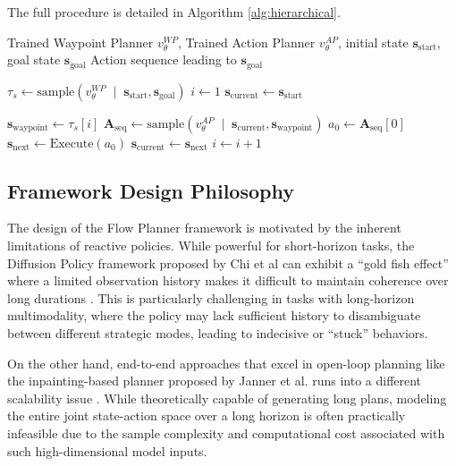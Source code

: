 The full procedure is detailed in Algorithm \ref{alg:hierarchical}.
\begin{algorithm}
\caption{Hierarchical Planning}\label{alg:hierarchical}
\begin{algorithmic}[1]
\Require Trained Waypoint Planner $v_{\theta}^{WP}$, Trained Action Planner $v_{\theta}^{AP}$, initial state $\mathbf{s}_{\text{start}}$, goal state $\mathbf{s}_{\text{goal}}$
\Ensure Action sequence leading to $\mathbf{s}_{\text{goal}}$

\State $\tau_s \gets \text{sample}\!\left(v_{\theta}^{WP} \;\mid\; \mathbf{s}_{\text{start}}, \mathbf{s}_{\text{goal}}\right)$ 
\State $i \gets 1$
\State $\mathbf{s}_{\text{current}} \gets \mathbf{s}_{\text{start}}$

    \State $\mathbf{s}_{\text{waypoint}} \gets \tau_s[i]$
    \State $\mathbf{A}_{\text{seq}} \gets \text{sample}\!\left(v_{\theta}^{AP} \;\mid\; \mathbf{s}_{\text{current}}, \mathbf{s}_{\text{waypoint}}\right)$
    \State $a_0 \gets \mathbf{A}_{\text{seq}}[0]$
    \State $\mathbf{s}_{\text{next}} \gets \text{Execute}(a_0)$ 
    \State $\mathbf{s}_{\text{current}} \gets \mathbf{s}_{\text{next}}$
     
        \State $i \gets i+1$ 
    \EndIf
\EndWhile

\end{algorithmic}
\end{algorithm}


\subsection{Framework Design Philosophy}
\label{sec:framework_design}
The design of the Flow Planner framework is motivated by the inherent limitations of reactive policies. While powerful for short-horizon tasks, the Diffusion Policy framework proposed by Chi et al can exhibit a “gold fish effect” where a limited observation history makes it difficult to maintain coherence over long durations \cite{jannerPlanningDiffusionFlexible2022}. This is particularly challenging in tasks with long-horizon multimodality, where the policy may lack sufficient history to disambiguate between different strategic modes, leading to indecisive or “stuck” behaviors.

On the other hand, end-to-end approaches that excel in open-loop planning like the inpainting-based planner proposed by Janner et al. runs into a different scalability issue \cite{chiDiffusionPolicyVisuomotor2023}. While theoretically capable of generating long plans, modeling the entire joint state-action space over a long horizon is often practically infeasible due to the sample complexity and computational cost associated with such high-dimensional model inputs.


